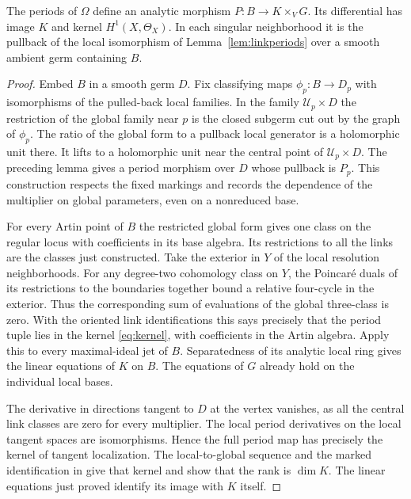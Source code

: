 \begin{proposition}\label{prop:period}
The periods of $\Omega$ define an analytic morphism $P:B\to K\times_VG$.
Its differential has image $K$ and kernel $H^1(X,\Theta_X)$.
In each singular neighborhood it is the pullback of the local
isomorphism of Lemma~\ref{lem:linkperiods} over a smooth ambient germ
containing $B$.
\end{proposition}
\begin{proof}
Embed $B$ in a smooth germ $D$. Fix classifying maps $\phi_p:B\to
D_p$ with isomorphisms of the pulled-back local families. In the
family $\mathcal U_p\times D$ the restriction of the global family near $p$ is the closed
subgerm cut out by the graph of $\phi_p$. The ratio of the global
form to a pullback local generator is a holomorphic unit there.
It lifts to a holomorphic unit near the central point of
$\mathcal U_p\times D$. The preceding lemma gives a period morphism
over $D$ whose pullback is $P_p$. This construction respects the
fixed markings and records the dependence of the multiplier on global
parameters, even on a nonreduced base.

For every Artin point of $B$ the restricted global form gives one class
on the regular locus with coefficients in its base algebra. Its
restrictions to all the links are the classes just constructed.
Take the exterior in $Y$ of the local resolution neighborhoods.
For any degree-two cohomology class on $Y$, the Poincar\'e duals
of its restrictions to the boundaries together bound a relative
four-cycle in the exterior. Thus the corresponding sum of evaluations
of the global three-class is zero. With the oriented link identifications
this says precisely that the period tuple lies in the kernel
\eqref{eq:kernel}, with coefficients in the Artin algebra.
Apply this to every maximal-ideal jet of $B$. Separatedness of its
analytic local ring gives the linear equations of $K$ on $B$.
The equations of $G$ already hold on the individual local bases.

The derivative in directions tangent to $D$ at the vertex vanishes, as
all the central link classes are zero for every multiplier. The local
period derivatives on the local tangent spaces are isomorphisms.
Hence the full period map has precisely the kernel of tangent
localization. The local-to-global sequence and the marked
identification in \cite[Theorem~2.5]{W5} give that kernel and show
that the rank is $\dim K$. The linear equations just proved identify
its image with $K$ itself.
\end{proof}
